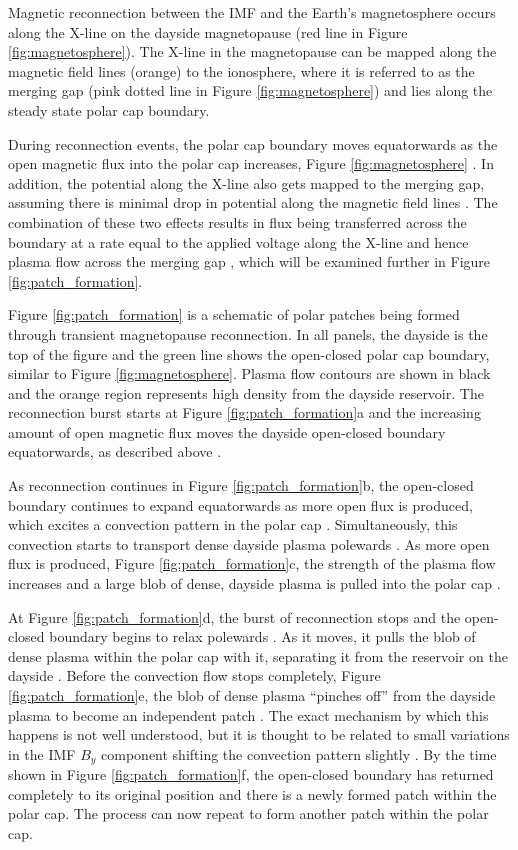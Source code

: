 Magnetic reconnection between the IMF and the Earth's magnetosphere occurs along the X-line on the dayside magnetopause (red line in Figure \ref{fig:magnetosphere}).  The X-line in the magnetopause can be mapped along the magnetic field lines (orange) to the ionosphere, where it is referred to as the merging gap (pink dotted line in Figure \ref{fig:magnetosphere}) and lies along the steady state polar cap boundary.  

During reconnection events, the polar cap boundary moves equatorwards as the open magnetic flux into the polar cap increases, Figure \ref{fig:magnetosphere} \citep{Cowley1991,Lockwood1992a}.  In addition, the potential along the X-line also gets mapped to the merging gap, assuming there is minimal drop in potential along the magnetic field lines \citep{Lockwood1992b}.  The combination of these two effects results in flux being transferred across the boundary at a rate equal to the applied voltage  along the X-line and hence plasma flow across the merging gap \citep{Lockwood1992b}, which will be examined further in Figure \ref{fig:patch_formation}.  

Figure \ref{fig:patch_formation} is a schematic of polar patches being formed through transient magnetopause reconnection.  In all panels, the dayside is the top of the figure and the green line shows the open-closed polar cap boundary, similar to Figure \ref{fig:magnetosphere}.  Plasma flow contours are shown in black and the orange region represents high density from the dayside reservoir.  The reconnection burst starts at Figure \ref{fig:patch_formation}a and the increasing amount of open magnetic flux moves the dayside open-closed boundary equatorwards, as described above \citep{Cowley1991}.

As reconnection continues in Figure \ref{fig:patch_formation}b, the open-closed boundary continues to expand equatorwards as more open flux is produced, which excites a convection pattern in the polar cap \citep{Cowley1991}.  Simultaneously, this convection starts to transport dense dayside plasma polewards \citep{Lockwood1992b}.  As more open flux is produced, Figure \ref{fig:patch_formation}c, the strength of the plasma flow increases and a large blob of dense, dayside plasma is pulled into the polar cap \citep{Lockwood1992b}.

At Figure \ref{fig:patch_formation}d, the burst of reconnection stops and the open-closed boundary begins to relax polewards \citep{Cowley1991}.  As it moves, it pulls the blob of dense plasma within the polar cap with it, separating it from the reservoir on the dayside \citep{Lockwood1992b}.  Before the convection flow stops completely, Figure \ref{fig:patch_formation}e, the blob of dense plasma ``pinches off'' from the dayside plasma to become an independent patch \citep{Lockwood1992b}.  The exact mechanism by which this happens is not well understood, but it is thought to be related to small variations in the IMF \(B_y\) component shifting the convection pattern slightly \citep{Cowley1980,Lockwood1992b}.  By the time shown in Figure \ref{fig:patch_formation}f, the open-closed boundary has returned completely to its original position and there is a newly formed patch within the polar cap.  The process can now repeat to form another patch within the polar cap.

